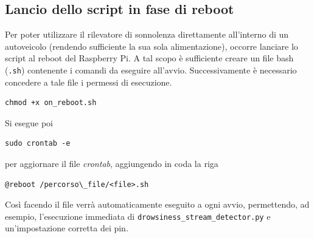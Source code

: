 \documentclass[12pt]{article}
\begin{document}
\subsection{Lancio dello script in fase di reboot}
Per poter utilizzare il rilevatore di sonnolenza direttamente all'interno di un autoveicolo (rendendo sufficiente la sua sola alimentazione), occorre lanciare lo script al reboot del Raspberry Pi. A tal scopo è sufficiente creare un file bash (\texttt{.sh}) contenente i comandi da eseguire all'avvio. Successivamente è necessario concedere a tale file i permessi di esecuzione.
\begin{lstlisting}
chmod +x on_reboot.sh
\end{lstlisting}
\newpage
Si esegue poi
\begin{lstlisting}
sudo crontab -e
\end{lstlisting}
per aggiornare il file \textit{crontab}, aggiungendo in coda la riga
\begin{lstlisting}
@reboot /percorso\_file/<file>.sh
\end{lstlisting}
Così facendo il file verrà automaticamente eseguito a ogni avvio, permettendo, ad esempio, l'esecuzione immediata di \texttt{drowsiness\_stream\_detector.py} e un'impostazione corretta dei pin.

\end{document}
